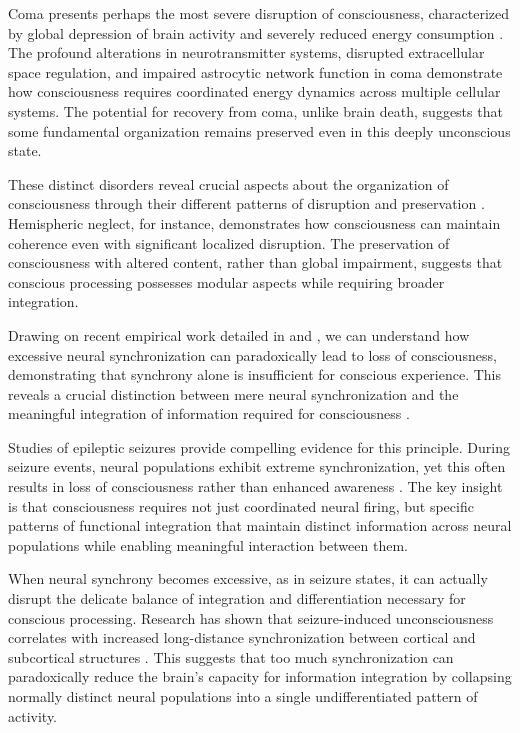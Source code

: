 Coma presents perhaps the most severe disruption of consciousness, characterized by global depression of brain activity and severely reduced energy consumption \cite{Adams2000}. The profound alterations in neurotransmitter systems, disrupted extracellular space regulation, and impaired astrocytic network function in coma demonstrate how consciousness requires coordinated energy dynamics across multiple cellular systems. The potential for recovery from coma, unlike brain death, suggests that some fundamental organization remains preserved even in this deeply unconscious state.

These distinct disorders reveal crucial aspects about the organization of consciousness through their different patterns of disruption and preservation \cite{Monti2010}. Hemispheric neglect, for instance, demonstrates how consciousness can maintain coherence even with significant localized disruption. The preservation of consciousness with altered content, rather than global impairment, suggests that conscious processing possesses modular aspects while requiring broader integration.

Drawing on recent empirical work detailed in \cite{LeVanQuyen2007} and \cite{Bartolomei2009}, we can understand how excessive neural synchronization can paradoxically lead to loss of consciousness, demonstrating that synchrony alone is insufficient for conscious experience. This reveals a crucial distinction between mere neural synchronization and the meaningful integration of information required for consciousness \cite{Koch2016,Tononi2015}.

Studies of epileptic seizures provide compelling evidence for this principle. During seizure events, neural populations exhibit extreme synchronization, yet this often results in loss of consciousness rather than enhanced awareness \cite{Bartolomei2009}. The key insight is that consciousness requires not just coordinated neural firing, but specific patterns of functional integration that maintain distinct information across neural populations while enabling meaningful interaction between them.

When neural synchrony becomes excessive, as in seizure states, it can actually disrupt the delicate balance of integration and differentiation necessary for conscious processing. Research has shown that seizure-induced unconsciousness correlates with increased long-distance synchronization between cortical and subcortical structures \cite{Bartolomei2009}. This suggests that too much synchronization can paradoxically reduce the brain's capacity for information integration by collapsing normally distinct neural populations into a single undifferentiated pattern of activity.

